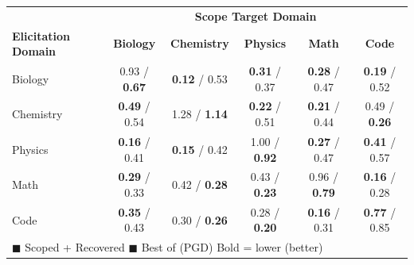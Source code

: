 
\begin{tabular}{l|ccccc}
\hline
 & \multicolumn{5}{c}{\textbf{Scope Target Domain}} \\
\textbf{Elicitation Domain} & \textbf{Biology} & \textbf{Chemistry} & \textbf{Physics} & \textbf{Math} & \textbf{Code} \\
\hline
Biology & \cellcolor{gray!20}\textcolor{ourscolor}{0.93} / \textcolor{basecolor}{\textbf{0.67}} & \cellcolor{green!20}\textcolor{ourscolor}{\textbf{0.12}} / \textcolor{basecolor}{0.53} & \cellcolor{green!20}\textcolor{ourscolor}{\textbf{0.31}} / \textcolor{basecolor}{0.37} & \cellcolor{green!20}\textcolor{ourscolor}{\textbf{0.28}} / \textcolor{basecolor}{0.47} & \cellcolor{green!20}\textcolor{ourscolor}{\textbf{0.19}} / \textcolor{basecolor}{0.52} \\
Chemistry & \cellcolor{green!20}\textcolor{ourscolor}{\textbf{0.49}} / \textcolor{basecolor}{0.54} & \cellcolor{gray!20}\textcolor{ourscolor}{1.28} / \textcolor{basecolor}{\textbf{1.14}} & \cellcolor{green!20}\textcolor{ourscolor}{\textbf{0.22}} / \textcolor{basecolor}{0.51} & \cellcolor{green!20}\textcolor{ourscolor}{\textbf{0.21}} / \textcolor{basecolor}{0.44} & \cellcolor{yellow!20}\textcolor{ourscolor}{0.49} / \textcolor{basecolor}{\textbf{0.26}} \\
Physics & \cellcolor{green!20}\textcolor{ourscolor}{\textbf{0.16}} / \textcolor{basecolor}{0.41} & \cellcolor{green!20}\textcolor{ourscolor}{\textbf{0.15}} / \textcolor{basecolor}{0.42} & \cellcolor{gray!20}\textcolor{ourscolor}{1.00} / \textcolor{basecolor}{\textbf{0.92}} & \cellcolor{green!20}\textcolor{ourscolor}{\textbf{0.27}} / \textcolor{basecolor}{0.47} & \cellcolor{green!20}\textcolor{ourscolor}{\textbf{0.41}} / \textcolor{basecolor}{0.57} \\
Math & \cellcolor{green!20}\textcolor{ourscolor}{\textbf{0.29}} / \textcolor{basecolor}{0.33} & \cellcolor{yellow!20}\textcolor{ourscolor}{0.42} / \textcolor{basecolor}{\textbf{0.28}} & \cellcolor{yellow!20}\textcolor{ourscolor}{0.43} / \textcolor{basecolor}{\textbf{0.23}} & \cellcolor{gray!20}\textcolor{ourscolor}{0.96} / \textcolor{basecolor}{\textbf{0.79}} & \cellcolor{green!20}\textcolor{ourscolor}{\textbf{0.16}} / \textcolor{basecolor}{0.28} \\
Code & \cellcolor{green!20}\textcolor{ourscolor}{\textbf{0.35}} / \textcolor{basecolor}{0.43} & \cellcolor{yellow!20}\textcolor{ourscolor}{0.30} / \textcolor{basecolor}{\textbf{0.26}} & \cellcolor{yellow!20}\textcolor{ourscolor}{0.28} / \textcolor{basecolor}{\textbf{0.20}} & \cellcolor{green!20}\textcolor{ourscolor}{\textbf{0.16}} / \textcolor{basecolor}{0.31} & \cellcolor{gray!20}\textcolor{ourscolor}{\textbf{0.77}} / \textcolor{basecolor}{0.85} \\
\hline
\multicolumn{6}{l}{\footnotesize \textcolor{ourscolor}{$\blacksquare$} Scoped + Recovered \quad \textcolor{basecolor}{$\blacksquare$} Best of (PGD) \quad Bold = lower (better)} \\
\end{tabular}